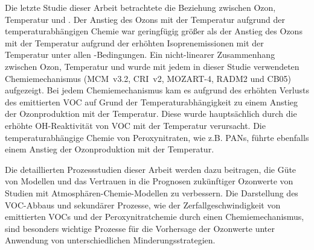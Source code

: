 Die letzte Studie dieser Arbeit betrachtete die Beziehung zwischen Ozon, Temperatur und .
Der Anstieg des Ozons mit der Temperatur aufgrund der temperaturabhängigen Chemie war geringfügig größer als der Anstieg des Ozons mit der Temperatur aufgrund der erhöhten Isoprenemissionen mit der Temperatur unter allen -Bedingungen.
Ein nicht-linearer Zusammenhang zwischen Ozon, Temperatur und  wurde mit jedem in dieser Studie verwendeten Chemiemechanismus (MCM~v3.2, CRI~v2, MOZART-4, RADM2 und CB05) aufgezeigt.
Bei jedem Chemiemechanismus kam es aufgrund des erhöhten Verlusts des emittierten VOC auf Grund der Temperaturabhängigkeit zu einem Anstieg der Ozonproduktion mit der Temperatur. Diese wurde hauptsächlich durch die erhöhte OH-Reaktivität von VOC mit der Temperatur verursacht.
Die temperaturabhängige Chemie von Peroxynitraten, wie z.B. PANs, führte ebenfalls einem Anstieg der Ozonproduktion mit der Temperatur.

Die detaillierten Prozessstudien dieser Arbeit werden dazu beitragen, die Güte von Modellen und das Vertrauen in die Prognosen zukünftiger Ozonwerte von Studien mit Atmosphären-Chemie-Modellen zu verbessern.
Die Darstellung des VOC-Abbaus und sekundärer Prozesse, wie der Zerfallgeschwindigkeit von emittierten VOCs und der Peroxynitratchemie durch einen Chemiemechanismus, sind besonders wichtige Prozesse für die Vorhersage der Ozonwerte unter Anwendung von unterschiedlichen Minderungsstrategien.
